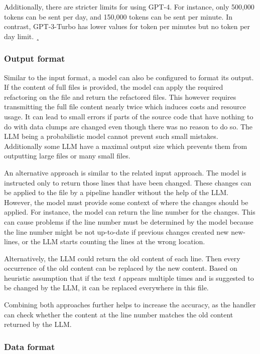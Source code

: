 Additionally, there are  stricter limits for using GPT-4. For instance, only 500,000 tokens can be sent per day, and 150,000 tokens can be sent per minute. In contrast, GPT-3-Turbo has  lower values for token per minutes but no  token per day limit.  ¸\cite{chatgpt_limits}

\subsubsection{Output format}
 Similar to the input format, a model can also be configured to format its output. If the content of full files is provided, the model can  apply the required refactoring on the file and return the refactored files. This however requires transmitting the full file content nearly twice which induces costs and resource usage. It can lead to small errors if parts of the source code that have nothing to do with data clumps are changed even though there was no reason to do so. The \ac{LLM} being a probabilistic model cannot prevent such small mistakes. Additionally some \acs{LLM} have a maximal output size which prevents them from outputting large files or many small files.

 An alternative approach is similar to the related input approach. The model is instructed only to return those lines that have been changed. These changes can be applied to the file by a pipeline handler without the help of the \ac{LLM}. However, the model must provide some context of where the changes should be applied. For instance, the model can return the line number for the changes. This can cause problems if the  line number must be determined by the model because the line number might be not up-to-date if previous changes created new new-lines, or the LLM starts counting the lines at the wrong location.

 Alternatively, the LLM could return the old content of each line. Then every occurrence of the old content can be replaced by the new content. Based on heuristic assumption that if the text \textit{t} appears multiple times and is suggested to be changed by the \ac{LLM}, it can be replaced everywhere in this file. 

 Combining both approaches further helps to increase the accuracy, as the handler can check whether the content at the line number matches the old content returned by the LLM.  
 

\subsubsection{Data format}

